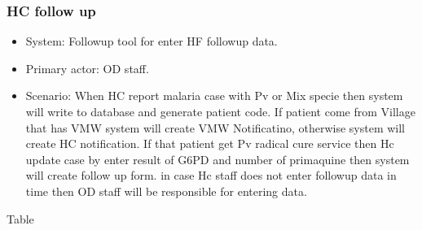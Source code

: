 \documentclass[letterpaper,10pt,english,openany,oneside]{sphinxmanual}
\begin{document}
\subsubsection{HC follow up}
\label{\detokenize{module/module:hc-follow-up}}\begin{itemize}
\item {} 
\sphinxAtStartPar
System: Followup tool for enter HF followup data.

\item {} 
\sphinxAtStartPar
Primary actor: OD staff.

\item {} 
\sphinxAtStartPar
Scenario: When HC report malaria case with Pv or Mix specie then system will write to database and generate patient code.
If patient come from Village that has VMW system will create VMW Notificatino, otherwise system will create HC notification.
If that patient get Pv radical cure service then Hc update case by enter result of G6PD and number of primaquine then system will create follow up form.
in case Hc staff does not enter followup data in time then OD staff will be responsible for entering data.

\end{itemize}

\sphinxAtStartPar
Table
\end{document}

